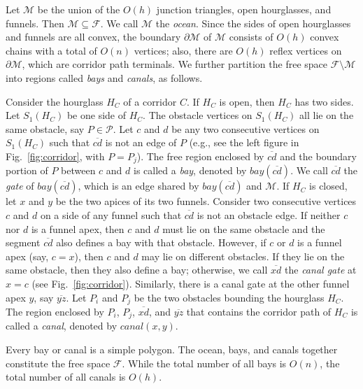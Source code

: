 \documentclass[english,runningheads,11pt]{llncs}
\def\calP{\mathcal{P}}
\def\calM{\mathcal{M}}
\def\calF{\mathcal{F}}
\def\bay{bay(\overline{cd})}
\begin{document}
Let $\calM$ be the union of the $O(h)$ junction triangles, open
hourglasses, and funnels.  Then $\calM\subseteq\calF$.
We call $\calM$ the {\em ocean}.
Since the sides of open hourglasses and funnels
are all convex, the boundary
$\partial\calM$ of $\calM$ consists of $O(h)$ convex chains with
a total of $O(n)$ vertices; also, there are $O(h)$ reflex vertices on $\partial\calM$,
which are corridor path terminals.
We further partition the free space $\calF\setminus \calM$ into regions called {\em
bays} and {\em canals}, as follows.

Consider the hourglass $H_C$ of a corridor $C$.
If $H_C$ is open, then $H_C$
has two sides. Let $S_1(H_C)$ be one side of $H_C$.
The obstacle vertices on $S_1(H_C)$ all lie on the same
obstacle, say $P\in\calP$. Let $c$ and $d$ be any two consecutive
vertices on $S_1(H_C)$ such that $\overline{cd}$ is
not an edge of $P$ (e.g., see the left figure in
Fig.~\ref{fig:corridor}, with $P=P_j$). The free region enclosed
by $\overline{cd}$ and the boundary portion of $P$ between $c$ and
$d$ is called a {\em bay}, denoted by
$bay(\overline{cd})$. We call
$\overline{cd}$ the {\em gate} of $bay(\overline{cd})$, which is
an edge shared by $\bay$ and $\calM$.
If $H_C$ is closed, let $x$ and $y$ be the two apices
of its two funnels. Consider two consecutive vertices $c$ and $d$ on
a side of any funnel such that $\overline{cd}$ is not an obstacle
edge. If neither $c$ nor $d$ is a funnel apex, then $c$ and $d$ must
lie on the same obstacle and the segment $\overline{cd}$ also
defines a bay with that obstacle. However, if $c$ or $d$ is a funnel
apex (say, $c=x$), then $c$ and $d$ may lie on different obstacles.
If they lie on the same obstacle, then they also define a bay;
otherwise, we call $\overline{xd}$ the {\em canal gate} at $x=c$
(see Fig.~\ref{fig:corridor}). Similarly, there is a canal gate
at the other funnel apex $y$, say $\overline{yz}$. Let $P_i$ and
$P_j$ be the two obstacles bounding the hourglass $H_C$. The
region enclosed by $P_i$, $P_j$,
$\overline{xd}$, and $\overline{yz}$ that contains the corridor path
of $H_C$ is called a {\em canal}, denoted by $canal(x,y)$.



Every bay or canal is a simple polygon.
The ocean, bays, and canals together
constitute the free space $\calF$. While the
total number of all bays is $O(n)$, the total number of all canals is
$O(h)$.
\end{document}
